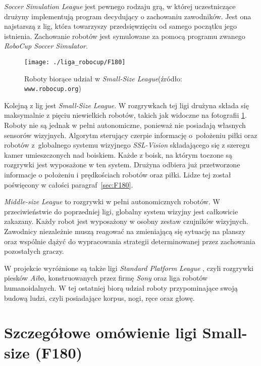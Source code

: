 	\emph{Soccer Simulation League} jest pewnego rodzaju grą, w której uczestniczące drużyny implementują program decydujący o zachowaniu zawodników.
	Jest ona najstarszą z lig, która towarzyszy przedsięwzięciu od samego początku jego istnienia.
	Zachowanie robotów jest symulowane za pomocą programu zwanego \emph{RoboCup Soccer Simulator}.
	\begin{figure}[b]
	\centering
	\texttt{[image: ./liga\_robocup/F180]}
	\caption{ Roboty biorące udział w \emph{Small-Size League}\newline(źródło: \texttt{www.robocup.org})} \label{fig:F180}
	\end{figure}
	
	Kolejną z lig jest \emph{Small-Size League}. W rozgrywkach tej ligi drużyna składa się maksymalnie z pięciu niewielkich robotów, takich jak widoczne na fotografii \ref{fig:F180}. 
	Roboty  nie są jednak w pełni autonomiczne, ponieważ nie posiadają własnych sensorów wizyjnych. Algorytm sterujący czerpie informację o~położeniu piłki oraz robotów z~globalnego systemu
	wizyjnego \textit{SSL-Vision} składającego się z szeregu kamer umieszczonych nad boiskiem. Każde z boisk, na którym toczone są rozgrywki jest wyposażone w ten system. Drużyna odbiera już przetworzone
	informacje o położeniu i prędkościach robotów oraz piłki.
	Lidze tej został poświęcony w całości paragraf~\ref{sec:F180}.	

	\emph{Middle-size League} to rozgrywki w pełni autonomicznych robotów. W przeciwieństwie do poprzedniej ligi, globalny system wizyjny jest całkowicie zakazany.
	Każdy robot jest wyposażony w osobny zestaw czujników wizyjnych. Zawodnicy niezależnie muszą reagować na zmieniającą się sytuację na planszy oraz
	wspólnie dążyć do wypracowania strategii determinowanej przez zachowania pozostałych graczy.

	W projekcie wyróżnione są także ligi \emph{Standard Platform League }, czyli rozgrywki piesków \textit{Aibo}, konstruowanych przez firmę \textit{Sony} oraz 
	liga robotów humanoidalnych. W tej ostatniej biorą udział roboty przypominające swoją budową ludzi, czyli posiadające korpus, nogi, ręce oraz głowę.
	\section{Szczegółowe omówienie ligi Small-size (F180) \label{sec:F180}}
